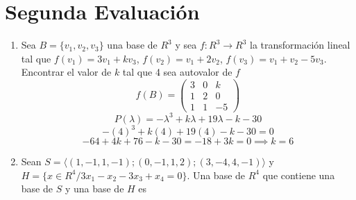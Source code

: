 \documentclass[../practica.root.tex]{subfiles}
\begin{document}
\section{Segunda Evaluación}
\begin{enumerate}
    \item Sea $B = \{v_1,v_2,v_3\}$ una base de $R^3$ y sea $f : R^3 \to R^3$ la transformación lineal tal que $f(v_1) = 3v_1 + kv_3$, $f(v_2) = v_1 + 2v_2$, $f(v_3) = v_1 + v_2 - 5v_3$. Encontrar el valor de $k$ tal que 4 sea autovalor de $f$
          \[
              f(B) = \begin{pmatrix}
                  3 & 0 & k  \\
                  1 & 2 & 0  \\
                  1 & 1 & -5
              \end{pmatrix}
          \] \[
              P(\lambda) = -\lambda^3 + k\lambda + 19\lambda - k - 30
          \] \[
              -(4)^3 + k(4) + 19(4) - k - 30 = 0
          \] \[
              -64 + 4k + 76 - k - 30 = -18 + 3k = 0 \implies \boxed{k = 6}
          \]

    \item Sean $S = \langle(1,-1,1,-1);(0,-1,1,2);(3,-4,4,-1)\rangle$ y $H = \{x \in R^4 / 3x_1 - x_2 - 3x_3 + x_4 = 0\}$. Una base de $R^4$ que contiene una base de $S$ y una base de $H$ es


\end{enumerate}
\end{document}
